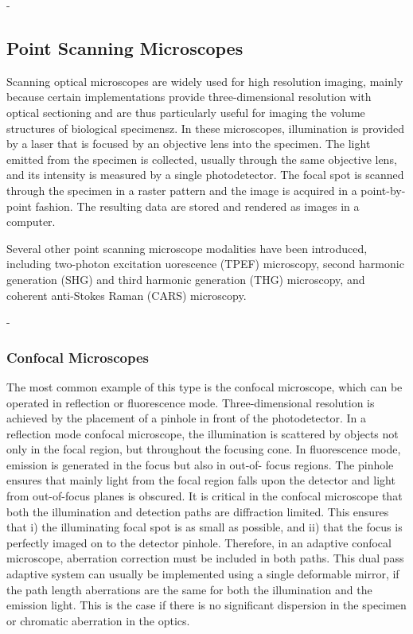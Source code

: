 -
\subsection{Point Scanning Microscopes}
\label{sec:PointScanningMicroscopes}

Scanning optical microscopes are widely used for high resolution imaging, 
mainly because certain implementations provide three-dimensional resolution 
with optical sectioning and are thus particularly useful for imaging the 
volume structures of biological specimensz. In these microscopes, 
illumination is provided by a laser that is focused by an objective lens into 
the specimen. The light emitted from the specimen is collected, usually 
through the same objective lens, and its intensity is measured by a single 
photodetector. The focal spot is scanned through the specimen in a raster 
pattern and the image is acquired in a point-by-point fashion. The resulting 
data are stored and rendered as images in a computer.

Several other point scanning microscope modalities have been introduced, 
including two-photon excitation uorescence (TPEF) microscopy, second harmonic 
generation (SHG) and third harmonic generation (THG) microscopy, and coherent 
anti-Stokes Raman (CARS) microscopy.

-
\subsubsection{Confocal Microscopes}
\label{sec:ConfocalMicroscopes}

The most common example of this type is the confocal microscope, which can be 
operated in reflection or fluorescence mode. Three-dimensional resolution is 
achieved by the placement of a pinhole in front of the photodetector. In a 
reflection mode confocal microscope, the illumination is scattered by objects 
not only in the focal region, but throughout the focusing cone. In 
fluorescence mode, emission is generated in the focus but also in out-of-
focus regions. The pinhole ensures that mainly light from the focal region 
falls upon the detector and light from out-of-focus planes is obscured. It is 
critical in the confocal microscope that both the illumination and detection 
paths are diffraction limited. This ensures that i) the illuminating focal 
spot is as small as possible, and ii) that the focus is perfectly imaged on 
to the detector pinhole. Therefore, in an adaptive confocal microscope, 
aberration correction must be included in both paths. This dual pass adaptive 
system can usually be implemented using a single deformable mirror, if the 
path length aberrations are the same for both the illumination and the 
emission light. This is the case if there is no significant dispersion in the 
specimen or chromatic aberration in the optics.

